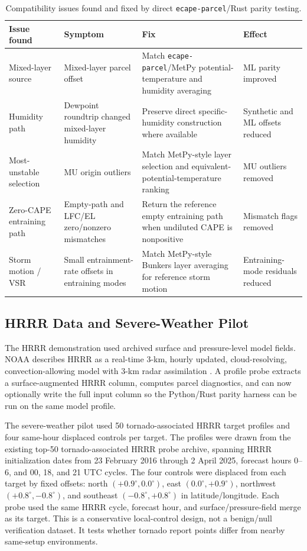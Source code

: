 \documentclass[11pt]{article}
\begin{document}
\begin{table}[H]
\centering
\small
\caption{Compatibility issues found and fixed by direct \texttt{ecape-parcel}/Rust parity testing.}
\label{tab:fixes}
\begin{tabular}{>{\raggedright\arraybackslash}p{}>{\raggedright\arraybackslash}p{}>{\raggedright\arraybackslash}p{}>{\raggedright\arraybackslash}p{}}
\toprule
Issue found & Symptom & Fix & Effect \\
\midrule
Mixed-layer source & Mixed-layer parcel offset & Match \texttt{ecape-parcel}/MetPy potential-temperature and humidity averaging & ML parity improved \\
Humidity path & Dewpoint roundtrip changed mixed-layer humidity & Preserve direct specific-humidity construction where available & Synthetic and ML offsets reduced \\
Most-unstable selection & MU origin outliers & Match MetPy-style layer selection and equivalent-potential-temperature ranking & MU outliers removed \\
Zero-CAPE entraining path & Empty-path and LFC/EL zero/nonzero mismatches & Return the reference empty entraining path when undiluted CAPE is nonpositive & Mismatch flags removed \\
Storm motion / VSR & Small entrainment-rate offsets in entraining modes & Match MetPy-style Bunkers layer averaging for reference storm motion & Entraining-mode residuals reduced \\
\bottomrule
\end{tabular}
\end{table}

\subsection{HRRR Data and Severe-Weather Pilot}

The HRRR demonstration used archived surface and pressure-level model fields. NOAA describes HRRR as a real-time 3-km, hourly updated, cloud-resolving, convection-allowing model with 3-km radar assimilation \cite{hrrrweb}. A profile probe extracts a surface-augmented HRRR column, computes parcel diagnostics, and can now optionally write the full input column so the Python/Rust parity harness can be run on the same model profile.

The severe-weather pilot used 50 tornado-associated HRRR target profiles and four same-hour displaced controls per target. The profiles were drawn from the existing top-50 tornado-associated HRRR probe archive, spanning HRRR initialization dates from 23 February 2016 through 2 April 2025, forecast hours 0--6, and 00, 18, and 21 UTC cycles. The four controls were displaced from each target by fixed offsets: north $(+0.9^\circ, 0.0^\circ)$, east $(0.0^\circ, +0.9^\circ)$, northwest $(+0.8^\circ, -0.8^\circ)$, and southeast $(-0.8^\circ, +0.8^\circ)$ in latitude/longitude. Each probe used the same HRRR cycle, forecast hour, and surface/pressure-field merge as its target. This is a conservative local-control design, not a benign/null verification dataset. It tests whether tornado report points differ from nearby same-setup environments.
\end{document}
